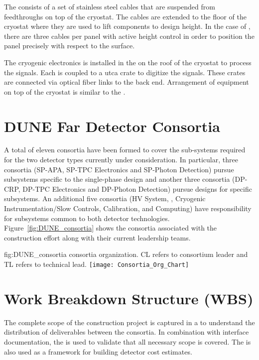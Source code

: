 The   consists of a set of stainless steel
cables that are suspended from feedthroughs on top of the
cryostat. The cables are extended to the floor of the cryostat where
they are used to lift components to design height. In the case of
, there are three cables per panel with active height
control in order to position the panel precisely with respect to the
 surface.

The cryogenic  electronics is installed in the
 on the roof of the cryostat to process the
 signals. Each  is coupled to a {utca}
crate to digitize the signals. These crates are connected via optical
fiber links to the  back end. Arrangement of equipment on
top of the cryostat is similar to the .

\section{DUNE Far Detector Consortia}
\label{sec:fdconsortia}

A total of eleven  consortia have been formed to cover 
the sub-systems required for the two detector types currently under
consideration.  In particular, three consortia (SP-APA, SP-TPC
Electronics and SP-Photon Detection) pursue subsystems specific to
the single-phase design and another three consortia (DP-CRP, DP-TPC
Electronics and DP-Photon Detection) pursue designs for 
specific subsystems.  An additional five consortia (HV System, ,
Cryogenic Instrumentation/Slow Controls, Calibration, and Computing)
have responsibility for subsystems common to both detector
technologies.  Figure~\ref{fig:DUNE_consortia} shows the consortia 
associated with the  construction effort along with their 
current leadership teams.  
\begin{dunefigure}{fig:DUNE_consortia}
  { consortia organization. CL refers to consortium leader
    and TL refers to technical lead.}
  \texttt{[image: Consortia\_Org\_Chart]}
\end{dunefigure}

\section{Work Breakdown Structure (WBS)}
\label{sec:fdsp-coord-wbs}

The complete scope of the  construction project is captured in a 
 to understand the distribution of deliverables between 
the consortia.  In combination with interface documentation, the 
 is used to validate that all necessary scope is covered.  The 
 is also used as a framework for building  
detector cost estimates.

